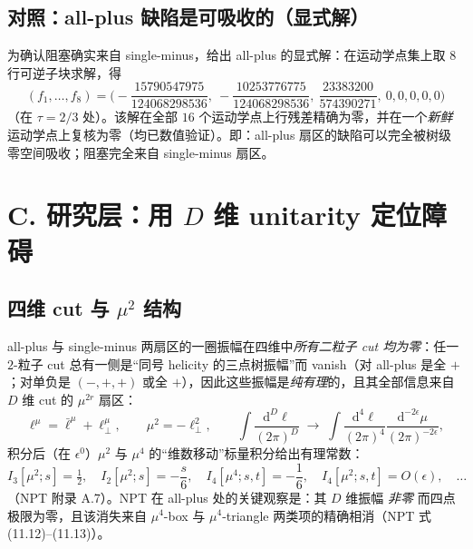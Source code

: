 \documentclass[11pt]{article}
\newcommand{\half}{\tfrac12}
\newcommand{\dd}{\mathrm{d}}
\begin{document}
\subsection{对照：all-plus 缺陷是可吸收的（显式解）}
为确认阻塞确实来自 single-minus，给出 all-plus 的显式解：在运动学点集上取 $8$ 行可逆子块求解，得
\begin{equation}
(f_1,\dots,f_8)=\Big(-\frac{15790547975}{124068298536},\ -\frac{10253776775}{124068298536},\ \frac{23383200}{574390271},\ 0,0,0,0,0\Big)
\end{equation}
（在 $\tau=2/3$ 处）。该解在全部 $16$ 个运动学点上行残差精确为零，并在一个\emph{新鲜}运动学点上复核为零（均已数值验证）。即：all-plus 扇区的缺陷可以完全被树级零空间吸收；阻塞完全来自 single-minus 扇区。

\section{C. 研究层：用 $D$ 维 unitarity 定位障碍}
\label{sec:research}

\subsection{四维 cut 与 $\mu^{2}$ 结构}
all-plus 与 single-minus 两扇区的一圈振幅在四维中\emph{所有二粒子 cut 均为零}：任一 $2$-粒子 cut 总有一侧是“同号 helicity 的三点树振幅”而 vanish（对 all-plus 是全 $+$；对单负是 $(-,+,+)$ 或全 $+$），因此这些振幅是\emph{纯有理}的，且其全部信息来自 $D$ 维 cut 的 $\mu^{2r}$ 扇区：
\begin{equation}
\ell^\mu=\bar\ell^\mu+\ell_\perp^\mu,\qquad \mu^2=-\ell_\perp^2,\qquad
\int \frac{\dd^{D}\ell}{(2\pi)^D}\;\longrightarrow\;
\int\frac{\dd^4\ell}{(2\pi)^4}\frac{\dd^{-2\epsilon}\mu}{(2\pi)^{-2\epsilon}} ,
\end{equation}
积分后（在 $\epsilon^0$）$\mu^{2}$ 与 $\mu^{4}$ 的“维数移动”标量积分给出有理常数：
\begin{equation}
I_3[\mu^2;s]=\half,\quad I_2[\mu^2;s]=-\frac{s}{6},\quad
I_4[\mu^4;s,t]=-\frac16,\quad I_4[\mu^2;s,t]=O(\epsilon),\quad\dots
\end{equation}
（NPT 附录 A.7）。NPT 在 all-plus 处的关键观察是：其 $D$ 维振幅 {\it 非零} 而四点极限为零，且该消失来自 $\mu^4$-box 与 $\mu^4$-triangle 两类项的精确相消（NPT 式 (11.12)--(11.13)）。
\end{document}
